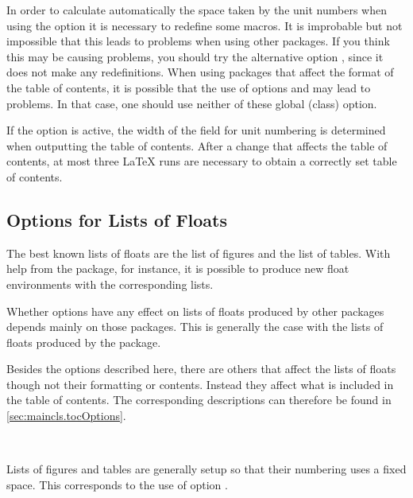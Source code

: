 \begin{Explain}
  In order to calculate automatically the space taken by the unit
  numbers when using the option  it is necessary to
  redefine some macros. It is improbable but not impossible that this
  leads to problems when using other packages. If you think this may
  be causing problems, you should try the alternative option
  , since it does not make any redefinitions. When
  using packages that affect the format of the table of contents, it
  is possible that the use of options  and
   may lead to problems. In that case, one should
  use neither of these global (class) option.

  If the  option is active, the width of the field for
  unit numbering is determined when outputting the table of contents.
  After a change that affects the table of contents, at most three
  \LaTeX{} runs are necessary to obtain a correctly set table of
  contents.
\end{Explain}
%
%
%

\subsection{Options for Lists of Floats}
\label{sec:maincls.listsOptions}

The best known lists of floats are the list of figures and the list of tables.
With help from the  package, for instance,
it is possible to produce new float environments with the corresponding lists.

\begin{Explain}
  Whether \KOMAScript{} options have any effect on lists of floats
  produced by other packages depends mainly on those packages. This is
  generally the case with the lists of floats produced by the
   package.

  Besides the options described here, there are others that affect the
  lists of floats though not their formatting or contents. Instead
  they affect what is included in the table of contents. The
  corresponding descriptions can therefore be found in
  \autoref{sec:maincls.tocOptions}.
\end{Explain}

\begin{Declaration}
  \\
\end{Declaration}%
%
%
Lists of figures and tables are
generally setup so that their numbering uses a fixed space. This
corresponds to the use of option .

